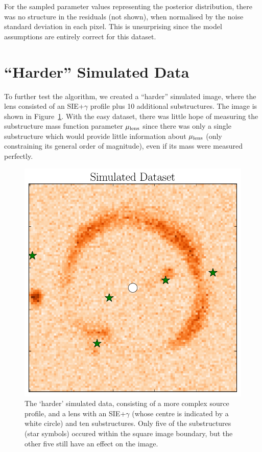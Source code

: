 \documentclass[useAMS,usenatbib]{mn2e}
\newcommand{\revisions}{\color{blue}}
\begin{document}
{\revisions
For the sampled parameter values representing the posterior distribution, there
was no structure in the residuals (not shown), when normalised by the noise
standard deviation in each pixel. This is unsurprising since the model
assumptions are entirely correct for this dataset.
}

{\revisions
\section{``Harder'' Simulated Data}
To further test the algorithm, we created a ``harder'' simulated image, where
the lens consisted of an SIE+$\gamma$ profile plus 10 additional substructures.
The image is shown in Figure~\ref{fig:image2}. With the easy dataset, there
was little hope of measuring the substructure mass function parameter
$\mu_{\rm lens}$ since there was only a single substructure which would provide
little information about $\mu_{\rm lens}$ (only constraining its general
order of magnitude), even if its mass were measured perfectly.}

\begin{figure}
\begin{center}
\includegraphics[scale=0.5]{image2.pdf}
\caption{{\revisions The `harder' simulated data, consisting of a more
complex source profile, and a lens with an SIE+$\gamma$ (whose centre is
indicated by a white circle) and ten substructures. Only five of the
substructures (star symbols) occured within the square image boundary, but the other five still have an effect on the image.}
\label{fig:image2}}
\end{center}
\end{figure}
\end{document}
